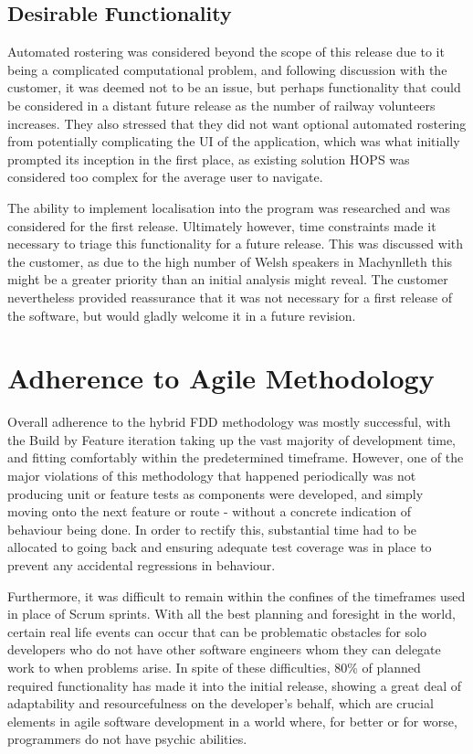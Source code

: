 \subsection{Desirable Functionality}

Automated rostering was considered beyond the scope of this release due to it being a complicated computational problem, and following discussion with the customer, it was deemed not to be an issue, but perhaps functionality that could be considered in a distant future release as the number of railway volunteers increases. They also stressed that they did not want optional automated rostering from potentially complicating the UI of the application, which was what initially prompted its inception in the first place, as existing solution HOPS was considered too complex for the average user to navigate.

The ability to implement localisation into the program was researched and was considered for the first release. Ultimately however, time constraints made it necessary to triage this functionality for a future release. This was discussed with the customer, as due to the high number of Welsh speakers in Machynlleth \cite{Census1} this might be a greater priority than an initial analysis might reveal. The customer nevertheless provided reassurance that it was not necessary for a first release of the software, but would gladly welcome it in a future revision.

\section{Adherence to Agile Methodology}
Overall adherence to the hybrid FDD methodology was mostly successful, with the Build by Feature iteration taking up the vast majority of development time, and fitting comfortably within the predetermined timeframe. However, one of the major violations of this methodology that happened periodically was not producing unit or feature tests as components were developed, and simply moving onto the next feature or route - without a concrete indication of behaviour being done. In order to rectify this, substantial time had to be allocated to going back and ensuring adequate test coverage was in place to prevent any accidental regressions in behaviour.

Furthermore, it was difficult to remain within the confines of the timeframes used in place of Scrum sprints. With all the best planning and foresight in the world, certain real life events can occur that can be problematic obstacles for solo developers who do not have other software engineers whom they can delegate work to when problems arise. In spite of these difficulties, 80\% of planned required functionality has made it into the initial release, showing a great deal of adaptability and resourcefulness on the developer's behalf, which are crucial elements in agile software development in a world where, for better or for worse, programmers do not have psychic abilities.

